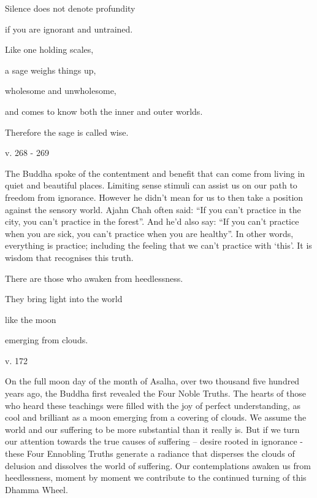 \documentclass[a4paper,portrait,12pt]{article}
\begin{document}
Silence does not denote profundity


if you are ignorant and untrained.


Like one holding scales,


a sage weighs things up, 


wholesome and unwholesome, 


and comes to know both the inner and outer worlds. 


Therefore the sage is called wise.





v. 268 - 269





The Buddha spoke of the contentment and benefit that can come from living in quiet and beautiful places. Limiting sense stimuli can assist us on our path to freedom from ignorance. However he didn't mean for us to then take a position against the sensory world. Ajahn Chah often said: ``If you can't practice in the city, you can't practice in the forest''. And he'd also say: ``If you can't practice when you are sick, you can't practice when you are healthy''. In other words, everything is practice; including the feeling that we can't practice with `this'. It is wisdom that recognises this truth.














There are those who awaken from heedlessness. 


They bring light into the world


like the moon 


emerging from clouds.





v. 172 





On the full moon day of the month of Asalha, over two thousand five hundred years ago, the Buddha first revealed the Four Noble Truths. The hearts of those who heard these teachings were filled with the joy of perfect understanding, as cool and brilliant as a moon emerging from a covering of clouds. We assume the world and our suffering to be more substantial than it really is. But if we turn our attention towards the true causes of suffering -- desire rooted in ignorance - these Four Ennobling Truths generate a radiance that disperses the clouds of delusion and dissolves the world of suffering. Our contemplations awaken us from heedlessness, moment by moment we contribute to the continued turning of this Dhamma Wheel.
\end{document}
